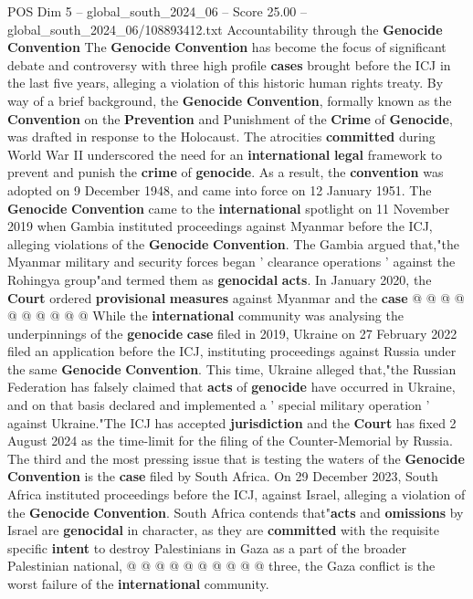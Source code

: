 \begin{textsample}{POS Dim 5 – global\_south\_2024\_06 – Score 25.00 – global\_south\_2024\_06/108893412.txt}  \label{ex:f5_pos_221}
Accountability through the \textbf{Genocide} \textbf{Convention} The \textbf{Genocide} \textbf{Convention} has become the focus of significant debate and controversy with three high profile \textbf{cases} brought before the ICJ in the last five years, alleging a violation of this historic human rights treaty.
By way of a brief background, the \textbf{Genocide} \textbf{Convention}, formally known as the \textbf{Convention} on the \textbf{Prevention} and Punishment of the \textbf{Crime} of \textbf{Genocide}, was drafted in response to the Holocaust.
The atrocities \textbf{committed} during World War II underscored the need for an \textbf{international} \textbf{legal} framework to prevent and punish the \textbf{crime} of \textbf{genocide}.
As a result, the \textbf{convention} was adopted on 9 December 1948, and came into force on 12 January 1951.
The \textbf{Genocide} \textbf{Convention} came to the \textbf{international} spotlight on 11 November 2019 when Gambia instituted proceedings against Myanmar before the ICJ, alleging violations of the \textbf{Genocide} \textbf{Convention}.
The Gambia argued that,"the Myanmar military and security forces began ' clearance operations ' against the Rohingya group"and termed them as \textbf{genocidal} \textbf{acts}.
In January 2020, the \textbf{Court} ordered \textbf{provisional} \textbf{measures} against Myanmar and the \textbf{case} @ @ @ @ @ @ @ @ @ @ While the \textbf{international} community was analysing the underpinnings of the \textbf{genocide} \textbf{case} filed in 2019, Ukraine on 27 February 2022 filed an application before the ICJ, instituting proceedings against Russia under the same \textbf{Genocide} \textbf{Convention}.
This time, Ukraine alleged that,"the Russian Federation has falsely claimed that \textbf{acts} of \textbf{genocide} have occurred in Ukraine, and on that basis declared and implemented a ' special military operation ' against Ukraine."The ICJ has accepted \textbf{jurisdiction} and the \textbf{Court} has fixed 2 August 2024 as the time-limit for the filing of the Counter-Memorial by Russia.
The third and the most pressing issue that is testing the waters of the \textbf{Genocide} \textbf{Convention} is the \textbf{case} filed by South Africa.
On 29 December 2023, South Africa instituted proceedings before the ICJ, against Israel, alleging a violation of the \textbf{Genocide} \textbf{Convention}.
South Africa contends that"\textbf{acts} and \textbf{omissions} by Israel are \textbf{genocidal} in character, as they are \textbf{committed} with the requisite specific \textbf{intent} to destroy Palestinians in Gaza as a part of the broader Palestinian national, @ @ @ @ @ @ @ @ @ @ three, the Gaza conflict is the worst failure of the \textbf{international} community.

\end{textsample}
